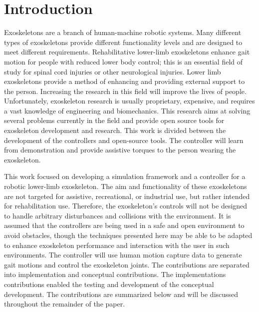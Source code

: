 \chapter{Introduction}

Exoskeletons are a branch of human-machine robotic systems. Many different types of exoskeletons provide different functionality levels and are designed to meet different requirements. Rehabilitative lower-limb exoskeletons enhance gait motion for people with reduced lower body control; this is an essential field of study for spinal cord injuries or other neurological injuries. Lower limb exoskeletons provide a method of enhancing and providing external support to the person. Increasing the research in this field will improve the lives of people. Unfortunately, exoskeleton research is usually proprietary, expensive, and requires a vast knowledge of engineering and biomechanics. This research aims at solving several problems currently in the field and provide open source tools for exoskeleton development and research. This work is divided between the development of the controllers and open-source tools. The controller will learn from demonstration and provide assistive torques to the person wearing the exoskeleton.


This work focused on developing a simulation framework and a controller for a robotic lower-limb exoskeleton. The aim and functionality of these exoskeletons are  not targeted for assistive, recreational, or industrial use, but rather intended for rehabilitation use. Therefore, the exoskeleton's controls will not be designed to handle arbitrary disturbances and collisions with the environment. It is assumed that the controllers are being used in a safe and open environment to avoid obstacles, though the techniques presented here may be able to be adapted to enhance exoskeleton performance and interaction with the user in such environments. The controller will use human motion capture data to generate gait motions and control the exoskeleton joints. The contributions are separated into implementation and conceptual contributions. The implementations contributions enabled the testing and development of the conceptual development. The contributions are summarized below and will be discussed throughout the remainder of the paper. 

